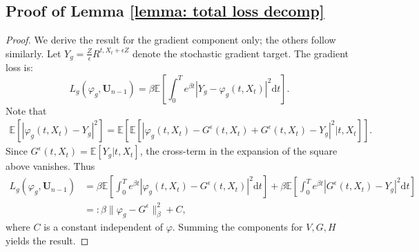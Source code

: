 \documentclass[twoside,11pt]{article}
\newcommand{\dd}{\mathrm{d}}
\newcommand{\E}{\mathbb{E}}
\newcommand{\1}{\mathbf{1}}
\numberwithin{equation}{section}
\begin{document}
\subsection{Proof of Lemma \ref{lemma: total loss decomp}}
\begin{proof}
    We derive the result for the gradient component only; the others follow similarly. Let $Y_g = \frac{Z}{\epsilon}R^{t, X_t+\epsilon Z}$ denote the stochastic gradient target. The gradient loss is:
    \begin{equation}
        L_g(\varphi_g,\mathbf{U}_{n-1}) = \beta \E\left[ \int_0^T e^{\beta t}|Y_g - \varphi_g(t,X_t)|^2 \dd t\right].
    \end{equation}
    Note that
    \begin{align*}
        \E \left[ \left| \varphi_g(t,X_t) - Y_g \right|^2 \right] = \E \left[ \E\left[ |\varphi_g(t,X_t) - G^\epsilon(t,X_t) + G^\epsilon(t,X_t) - Y_g |^2 \big| t,X_t \right] \right].
    \end{align*}
    Since $G^\epsilon(t,X_t) = \E[Y_g|t,X_t]$, the cross-term in the expansion of the square above vanishes. Thus
    \begin{align*}
        L_g(\varphi_g,\mathbf{U}_{n-1}) &= \beta\E \left[ \int_0^T e^{\beta t}|\varphi_g(t,X_t) - G^\epsilon(t,X_t)|^2 \dd t\right] + \beta \E\left[\int_0^Te^{\beta t} |G^\epsilon(t,X_t) - Y_g|^2 \dd t\right] \\
        &=: \beta\|\varphi_g - G^{\epsilon}\|_{\beta}^2 + C,
    \end{align*}
    where $ C$ is a constant independent of $ \varphi$. Summing the components for $V, G, H$ yields the result.
\end{proof}
\end{document}
